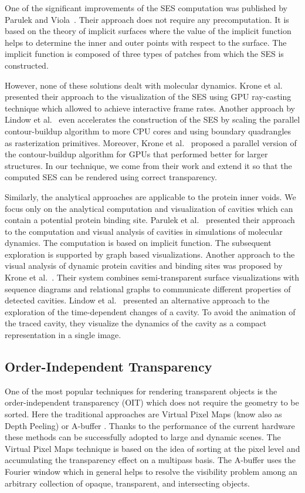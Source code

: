 One of the significant improvements of the SES computation was published by Parulek and Viola~\cite{parulek2012implicit}.
Their approach does not require any precomputation. 
It is based on the theory of implicit surfaces where the value of the implicit function helps to determine the inner and outer points with respect to the surface.
The implicit function is composed of three types of patches from which the SES is constructed.

However, none of these solutions dealt with molecular dynamics. 
Krone et al.~\cite{krone2009interactive} presented their approach to the visualization of the SES using GPU ray-casting technique which allowed to achieve interactive frame rates. 
Another approach by Lindow et al.~\cite{lindow2010accelerated} even accelerates the construction of the SES by scaling the parallel contour-buildup algorithm to more CPU cores and using boundary quadrangles as rasterization primitives.
Moreover, Krone et al.~\cite{krone2011parallel} proposed a parallel version of the contour-buildup algorithm for GPUs that performed better for larger structures.
In our technique, we come from their work and extend it so that the computed SES can be rendered using correct transparency.

Similarly, the analytical approaches are applicable to the protein inner voids. 
We focus only on the analytical computation and visualization of cavities which can contain a potential protein binding site.
Parulek et al.~\cite{parulek2013visual} presented their approach to the computation and visual analysis of cavities in simulations of molecular dynamics.
The computation is based on implicit function. 
The subsequent exploration is supported by graph based visualizations.
Another approach to the visual analysis of dynamic protein cavities and binding sites was proposed by Krone et al.~\cite{Krone2014}.
Their system combines semi-transparent surface visualizations with sequence diagrams and relational graphs to communicate different properties of detected cavities.
Lindow et al.~\cite{Lindow2013} presented an alternative approach to the exploration of the time-dependent changes of a cavity. 
To avoid the animation of the traced cavity, they visualize the dynamics of the cavity as a compact representation in a single image. 

\subsection{Order-Independent Transparency}
One of the most popular techniques for rendering transparent objects is the order-independent transparency (OIT) which does not require the geometry to be sorted.
Here the traditional approaches are Virtual Pixel Maps (know also as Depth Peeling) \cite{mammen1989transparency} or A-buffer \cite{carpenter1984abuffer}.
Thanks to the performance of the current hardware these methods can be successfully adopted to large and dynamic scenes.
The Virtual Pixel Maps technique is based on the idea of sorting at the pixel level and accumulating the transparency effect on a multipass basis. 
The A-buffer uses the Fourier window which in general helps to resolve the visibility problem among an arbitrary collection of opaque, transparent, and intersecting objects.

